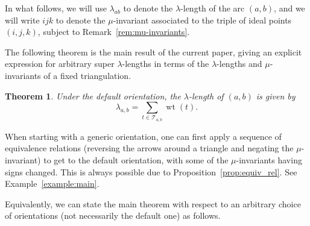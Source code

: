 \documentclass[pdftex]{sigma}
\numberwithin{equation}{section}
\newtheorem{Theorem}{Theorem}[section]
\DeclareMathOperator{\wt}{wt}
\begin{document}
 In what follows, we will use $\lambda_{ab}$ to denote the $\lambda$-length of the arc $(a,b)$,
 and we will write $\boxed{ijk}$ to denote the $\mu$-invariant associated to the triple of
 ideal points $(i,j,k)$, subject to Remark~\ref{rem:mu-invariants}.
	
The following theorem is the main result of the current paper, giving an explicit expression for arbitrary super $\lambda$-lengths
in terms of the $\lambda$-lengths and $\mu$-invariants of a fixed triangulation.

\begin{Theorem}\label{thm:main}
Under the default orientation,
 the $\lambda$-length of $(a,b)$ is given by
 \[\lambda_{a,b} = \sum_{t\in\mathcal T_{a,b}} \wt(t).
 \]
\end{Theorem}

When starting with a generic orientation, one can first apply a sequence of equivalence relations (reversing the arrows around a triangle and negating the $\mu$-invariant)
to get to the default orientation, with some of the $\mu$-invariants having signs changed. This is always possible due to Proposition~\ref{prop:equiv_rel}. See Example~\ref{example:main}.

Equivalently, we can state the main theorem with respect to an arbitrary choice of orientations (not necessarily the default one) as follows.
\end{document}
